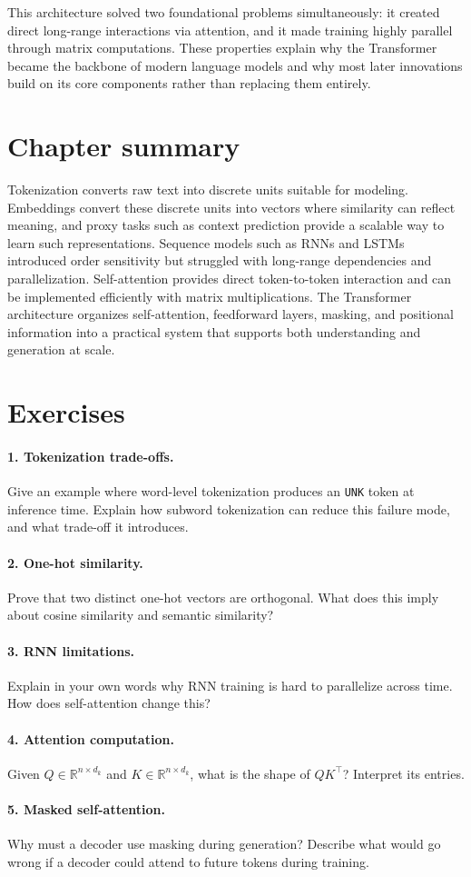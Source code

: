 This architecture solved two foundational problems simultaneously: it created direct long-range interactions via attention, and it made training highly parallel through matrix computations. These properties explain why the Transformer became the backbone of modern language models and why most later innovations build on its core components rather than replacing them entirely.

\section{Chapter summary}
Tokenization converts raw text into discrete units suitable for modeling. Embeddings convert these discrete units into vectors where similarity can reflect meaning, and proxy tasks such as context prediction provide a scalable way to learn such representations. Sequence models such as RNNs and LSTMs introduced order sensitivity but struggled with long-range dependencies and parallelization. Self-attention provides direct token-to-token interaction and can be implemented efficiently with matrix multiplications. The Transformer architecture organizes self-attention, feedforward layers, masking, and positional information into a practical system that supports both understanding and generation at scale.

\section{Exercises}
\paragraph{1. Tokenization trade-offs.}
Give an example where word-level tokenization produces an \texttt{UNK} token at inference time. Explain how subword tokenization can reduce this failure mode, and what trade-off it introduces.

\paragraph{2. One-hot similarity.}
Prove that two distinct one-hot vectors are orthogonal. What does this imply about cosine similarity and semantic similarity?

\paragraph{3. RNN limitations.}
Explain in your own words why RNN training is hard to parallelize across time. How does self-attention change this?

\paragraph{4. Attention computation.}
Given $Q \in \mathbb{R}^{n\times d_k}$ and $K \in \mathbb{R}^{n\times d_k}$, what is the shape of $QK^\top$? Interpret its entries.

\paragraph{5. Masked self-attention.}
Why must a decoder use masking during generation? Describe what would go wrong if a decoder could attend to future tokens during training.
